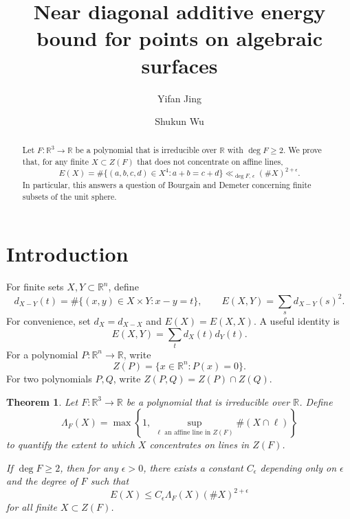 \documentclass{amsart}%
\numberwithin{equation}{section}
\newtheorem{theorem}{Theorem}[section]
\newcommand{\e}{\epsilon}
\newcommand{\ZR}{\mathbb{R}}
\newcommand{\1}{\mathbbm{1}}
\begin{document}
\title[Energy bound for points on algebraic surfaces]{Near diagonal additive energy bound for points on algebraic surfaces}

\author{Yifan Jing}
\address{Department of Mathematics, Ohio State University, Columbus, OH, USA}

\author{Shukun Wu}
\address{Department of Mathematics, Indiana University Bloomington, Bloomington, IN, USA}




\date{}
\begin{abstract} 
Let $F:\ZR^3\to\ZR$ be a polynomial that is irreducible over $\ZR$ with $\deg F\geq2$.
We prove that, for any finite $X\subset Z(F)$ that does not concentrate on affine lines,
\[
    E(X)=\#\{(a,b,c,d)\in X^4: a+b=c+d\}\ll_{\deg F,\,\epsilon}(\# X)^{2+\epsilon}.
\]
In particular, this answers a question of Bourgain and Demeter concerning finite subsets of the unit sphere.

\end{abstract}

\maketitle

\section{Introduction}


For finite sets $X,Y\subset\ZR^n$, define
\[
    d_{X-Y}(t)=\#\{(x,y)\in X\times Y: x-y=t\}, \qquad E(X,Y)=\sum_s d_{X-Y}(s)^2.
\]
For convenience, set $d_X=d_{X-X}$ and $E(X)=E(X,X)$.
A useful identity is
\begin{equation}
\label{useful-identity}
    E(X,Y)=\sum_t d_X(t)d_Y(t).
\end{equation}
For a polynomial $P:\ZR^n\to\ZR$, write
\[
    Z(P)=\{x\in\ZR^n:P(x)=0\}.
\]
For two polynomials $P,Q$, write $Z(P,Q)=Z(P)\cap Z(Q)$.



\begin{theorem}
\label{main-thm}
Let $F:\ZR^3\to\ZR$ be a polynomial that is irreducible over $\ZR$.
Define 
\begin{equation}
\label{quantifier}
    \Lambda_{F}(X) = \max\left\{1, \,\sup_{\ell \text{ an affine line in }Z(F)}\#(X\cap\ell)\right\}
\end{equation}
to quantify the extent to which $X$ concentrates on lines in $Z(F)$.

If $\deg F\geq2$, then for any $\e>0$, there exists a constant $C_\e$ depending only on $\e$ and the degree of $F$ such that
\begin{equation}
\label{main-esti}
    E(X)\leq C_{\e}\Lambda_{F}(X)(\#X)^{2+\e}
\end{equation}
for all finite $X\subset Z(F)$.
\end{theorem} 
\end{document}
